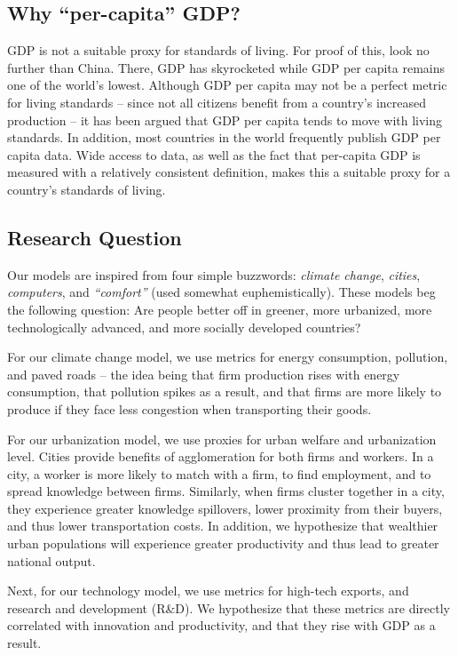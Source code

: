 \documentclass[11pt]{article}
\begin{document}
\subsection{Why ``per-capita'' GDP?}
GDP is not a suitable proxy for standards of living. For proof of this, look no further than China. There, GDP has skyrocketed while GDP per capita remains one of the world's lowest. Although GDP per capita may not be a perfect metric for living standards -- since not all citizens benefit from a country's increased production -- it has been argued that GDP per capita tends to move with living standards. In addition, most countries in the world frequently publish GDP per capita data. Wide access to data, as well as the fact that per-capita GDP is measured with a relatively consistent definition, makes this a suitable proxy for a country's standards of living.

\subsection{Research Question}
Our models are inspired from four simple buzzwords: \emph{climate change}, \emph{cities}, \emph{computers}, and \emph{``comfort''} (used somewhat euphemistically). These models beg the following question: Are people better off in greener, more urbanized, more technologically advanced, and more socially developed countries?

For our climate change model, we use metrics for energy consumption, pollution, and paved roads -- the idea being that firm production rises with energy consumption, that pollution spikes as a result, and that firms are more likely to produce if they face less congestion when transporting their goods.

For our urbanization model, we use proxies for urban welfare and urbanization level. Cities provide benefits of agglomeration for both firms and workers. In a city, a worker is more likely to match with a firm, to find employment, and to spread knowledge between firms. Similarly, when firms cluster together in a city, they experience greater knowledge spillovers, lower proximity from their buyers, and thus lower transportation costs. In addition, we hypothesize that wealthier urban populations will experience greater productivity and thus lead to greater national output.

Next, for our technology model, we use metrics for high-tech exports, and research and development (R\&D). We hypothesize that these metrics are directly correlated with innovation and productivity, and that they rise with GDP as a result.
\end{document}
